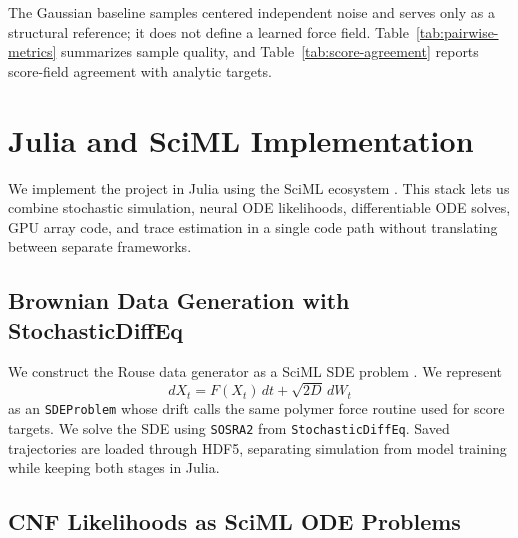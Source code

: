 \documentclass[reprint,amsmath,amssymb,aps,pra,10pt]{revtex4-2}
\begin{document}
The Gaussian baseline samples centered independent noise and serves only as a structural reference; it does not define a learned force field.
Table~\ref{tab:pairwise-metrics} summarizes sample quality, and Table~\ref{tab:score-agreement} reports score-field agreement with analytic targets.
\section{Julia and SciML Implementation}

We implement the project in Julia using the SciML ecosystem \cite{bezanson2017,rackauckas2017,rackauckas2020universal}.
This stack lets us combine stochastic simulation, neural ODE likelihoods, differentiable ODE solves, GPU array code, and trace estimation in a single code path without translating between separate frameworks.

\subsection*{Brownian Data Generation with StochasticDiffEq}

We construct the Rouse data generator as a SciML SDE problem \cite{rouse1953,rackauckas2017}.
We represent
\begin{equation}
    dX_t = F(X_t)\,dt + \sqrt{2D}\,dW_t
\end{equation}
as an \texttt{SDEProblem} whose drift calls the same polymer force routine used for score targets.
We solve the SDE using \texttt{SOSRA2} from \texttt{StochasticDiffEq}.
Saved trajectories are loaded through HDF5, separating simulation from model training while keeping both stages in Julia.

\subsection*{CNF Likelihoods as SciML ODE Problems}
\end{document}
